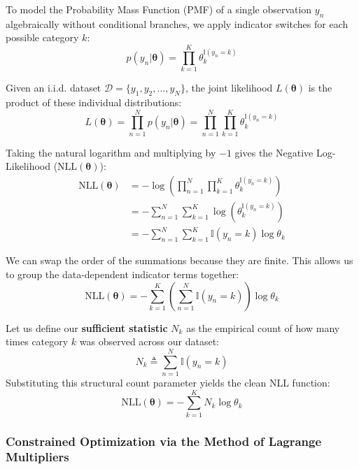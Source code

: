 \documentclass{article}
\begin{document}
To model the Probability Mass Function (PMF) of a single observation $y_n$ algebraically without conditional branches, we apply indicator switches for each possible category $k$:
\begin{equation}
p(y_n | \boldsymbol{\theta}) = \prod_{k=1}^K \theta_k^{\mathbb{I}(y_n = k)}
\end{equation}

Given an i.i.d. dataset $\mathcal{D} = \{y_1, y_2, \dots, y_N\}$, the joint likelihood $L(\boldsymbol{\theta})$ is the product of these individual distributions:
\begin{equation}
L(\boldsymbol{\theta}) = \prod_{n=1}^N p(y_n | \boldsymbol{\theta}) = \prod_{n=1}^N \prod_{k=1}^K \theta_k^{\mathbb{I}(y_n = k)}
\end{equation}

Taking the natural logarithm and multiplying by $-1$ gives the Negative Log-Likelihood ($\text{NLL}(\boldsymbol{\theta})$):
\begin{align*}
\text{NLL}(\boldsymbol{\theta}) &= -\log \left( \prod_{n=1}^N \prod_{k=1}^K \theta_k^{\mathbb{I}(y_n = k)} \right) \\
&= -\sum_{n=1}^N \sum_{k=1}^K \log \left( \theta_k^{\mathbb{I}(y_n = k)} \right) \\
&= -\sum_{n=1}^N \sum_{k=1}^K \mathbb{I}(y_n = k) \log \theta_k
\end{align*}

We can swap the order of the summations because they are finite. This allows us to group the data-dependent indicator terms together:
\begin{equation}
\text{NLL}(\boldsymbol{\theta}) = -\sum_{k=1}^K \left( \sum_{n=1}^N \mathbb{I}(y_n = k) \right) \log \theta_k
\end{equation}

Let us define our \textbf{sufficient statistic} $N_k$ as the empirical count of how many times category $k$ was observed across our dataset:
\begin{equation}
N_k \triangleq \sum_{n=1}^N \mathbb{I}(y_n = k)
\end{equation}
Substituting this structural count parameter yields the clean NLL function:
\begin{equation}
\text{NLL}(\boldsymbol{\theta}) = -\sum_{k=1}^K N_k \log \theta_k
\end{equation}

\subsubsection{Constrained Optimization via the Method of Lagrange Multipliers}
\end{document}
